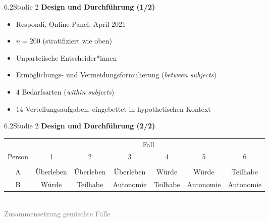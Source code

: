 \documentclass[xcolor=table,9pt,aspectratio=169]{beamer}
\begin{document}
\begin{frame}{\vspace*{10mm}6.2\hspace*{1em}Studie 2}
\textbf{Design und Durchführung (1/2)}\\
\medskip
\begin{itemize}
   \item Respondi, Online-Panel, April 2021
   \item $n=200$ (stratifiziert wie oben)
   \item Unparteiische Entscheider*innen
   \item Ermöglichungs- und Vermeidungsformulierung (\textit{between subjects})
   \item $4$ Bedarfsarten (\textit{within subjects})
   \item $14$ Verteilungsaufgaben, eingebettet in hypothetischen Kontext
\end{itemize}
\end{frame}


\begin{frame}{\vspace*{10mm}6.2\hspace*{1em}Studie 2}
\textbf{Design und Durchführung (2/2)}\\
\medskip
\begin{center}
   \begin{tabular}{ccccccc}
      \arrayrulecolor{blue2}
      \hline
               & \multicolumn{6}{c}{Fall}                                                         \\
      Person   & 1           & 2           & 3           & 4          & 5           & 6           \\
      \hline\hline\\[-0.5em]
      A        & Überleben   & Überleben   & Überleben   & Würde      & Würde       & Teilhabe    \\
      B        & Würde       & Teilhabe    & Autonomie   & Teilhabe   & Autonomie   & Autonomie   \\
      \hline
   \end{tabular}\\
   \smallskip
   \textcolor{gray}{Zusammensetzung gemischte Fälle}
\end{center}
\end{frame}
\end{document}
